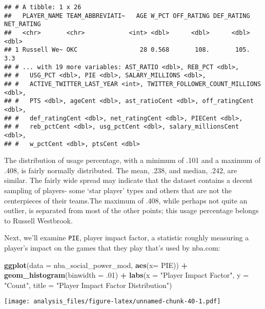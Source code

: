 \documentclass[]{article}
\newenvironment{Shaded}{\begin{snugshade}}{\end{snugshade}}
\newcommand{\DataTypeTok}[1]{\textcolor[rgb]{0.13,0.29,0.53}{#1}}
\newcommand{\FloatTok}[1]{\textcolor[rgb]{0.00,0.00,0.81}{#1}}
\newcommand{\KeywordTok}[1]{\textcolor[rgb]{0.13,0.29,0.53}{\textbf{#1}}}
\newcommand{\NormalTok}[1]{#1}
\newcommand{\OperatorTok}[1]{\textcolor[rgb]{0.81,0.36,0.00}{\textbf{#1}}}
\newcommand{\StringTok}[1]{\textcolor[rgb]{0.31,0.60,0.02}{#1}}
\begin{document}
\begin{verbatim}
## # A tibble: 1 x 26
##   PLAYER_NAME TEAM_ABBREVIATI~   AGE W_PCT OFF_RATING DEF_RATING NET_RATING
##   <chr>       <chr>            <int> <dbl>      <dbl>      <dbl>      <dbl>
## 1 Russell We~ OKC                 28 0.568       108.       105.        3.3
## # ... with 19 more variables: AST_RATIO <dbl>, REB_PCT <dbl>,
## #   USG_PCT <dbl>, PIE <dbl>, SALARY_MILLIONS <dbl>,
## #   ACTIVE_TWITTER_LAST_YEAR <int>, TWITTER_FOLLOWER_COUNT_MILLIONS <dbl>,
## #   PTS <dbl>, ageCent <dbl>, ast_ratioCent <dbl>, off_ratingCent <dbl>,
## #   def_ratingCent <dbl>, net_ratingCent <dbl>, PIECent <dbl>,
## #   reb_pctCent <dbl>, usg_pctCent <dbl>, salary_millionsCent <dbl>,
## #   w_pctCent <dbl>, ptsCent <dbl>
\end{verbatim}

The distribution of usage percentage, with a minimum of .101 and a
maximum of .408, is fairly normally distributed. The mean, .238, and
median, .242, are similar. The fairly wide spread may indicate that the
dataset contains a decent sampling of players- some `star player' types
and others that are not the centerpieces of their teams.The maximum of
.408, while perhaps not quite an outlier, is separated from most of the
other points; this usage percentage belongs to Russell Westbrook.

Next, we'll examine \texttt{PIE}, player impact factor, a statistic
roughly measuring a player's impact on the games that they play that's
used by nba.com:

\begin{Shaded}
\begin{Highlighting}[]
\KeywordTok{ggplot}\NormalTok{(}\DataTypeTok{data =}\NormalTok{ nba_social_power_mod, }\KeywordTok{aes}\NormalTok{(}\DataTypeTok{x=}\NormalTok{ PIE)) }\OperatorTok{+}\StringTok{ }
\StringTok{  }\KeywordTok{geom_histogram}\NormalTok{(}\DataTypeTok{binwidth =} \FloatTok{.01}\NormalTok{) }\OperatorTok{+}
\StringTok{  }\KeywordTok{labs}\NormalTok{(}\DataTypeTok{x =} \StringTok{"Player Impact Factor"}\NormalTok{, }\DataTypeTok{y =} \StringTok{"Count"}\NormalTok{,}
       \DataTypeTok{title =} \StringTok{"Player Impact Factor Distribution"}\NormalTok{)}
\end{Highlighting}
\end{Shaded}

\texttt{[image: analysis\_files/figure-latex/unnamed-chunk-40-1.pdf]}

\begin{Shaded}
\end{Shaded}
\end{document}
